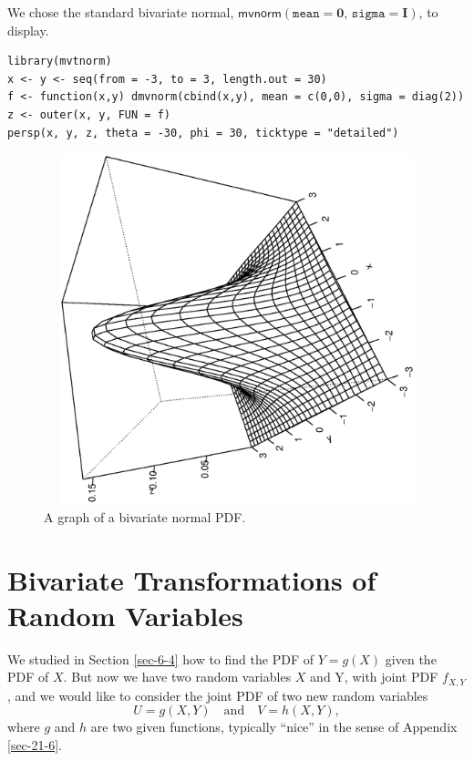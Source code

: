 \documentclass[captions=tableheading]{scrbook}
\begin{document}
We chose the standard bivariate normal, \(\mathsf{mvnorm}(\mathtt{mean}=\mathbf{0},\,\mathtt{sigma}=\mathbf{I})\), to display.


\lstset{language=R}
\begin{lstlisting}
library(mvtnorm)
x <- y <- seq(from = -3, to = 3, length.out = 30)
f <- function(x,y) dmvnorm(cbind(x,y), mean = c(0,0), sigma = diag(2))
z <- outer(x, y, FUN = f)
persp(x, y, z, theta = -30, phi = 30, ticktype = "detailed")
\end{lstlisting}





\begin{figure}[th]
  \includegraphics[width=5in, height=4in]{ps/multdist/mvnorm-pdf.ps}
  \caption[Graph of a bivariate normal PDF]{\small A graph of a bivariate normal PDF.}
  \label{fig-mvnorm-pdf}
\end{figure}
\section{Bivariate Transformations of Random Variables}
\label{sec-7-7}
\label{sec-Transformations-Multivariate}


We studied in Section \ref{sec-6-4} how to find the PDF of \(Y=g(X)\) given the PDF of \(X\). But now we have two random variables \(X\) and Y, with joint PDF \(f_{X,Y}\), and we would like to consider the joint PDF of two new random variables
\begin{equation}
U=g(X,Y)\quad \mbox{and}\quad V=h(X,Y),
\end{equation}
where \(g\) and \(h\) are two given functions, typically ``nice'' in the sense of Appendix \ref{sec-21-6}. 
\end{document}

